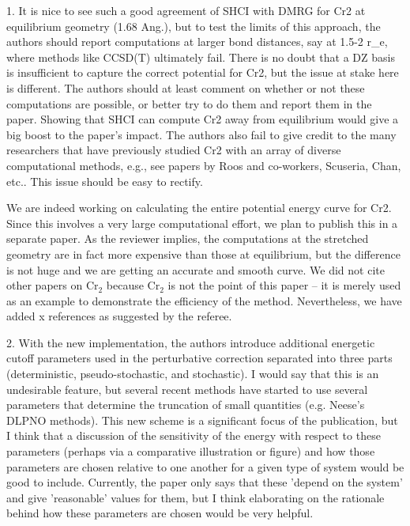 \documentclass[
reprint,
 superscriptaddress,
 amsmath,amssymb,
 aps,
]{revtex4-1}
\begin{document}
{\color{blue}
1. It is nice to see such a good agreement of SHCI with DMRG for Cr2 at equilibrium geometry (1.68 Ang.), but to test the limits of this approach, the authors should report computations at larger bond distances, say at 1.5-2 r\_e, where methods like CCSD(T) ultimately fail. There is no doubt that a DZ basis is insufficient to capture the correct potential for Cr2, but the issue at stake here is different. The authors should at least comment on whether or not these computations are possible, or better try to do them and report them in the paper. Showing that SHCI can compute Cr2 away from equilibrium would give a big boost to the paper's impact. The authors also fail to give credit to the many researchers that have previously studied Cr2 with an array of diverse computational methods, e.g., see papers by Roos and co-workers, Scuseria, Chan, etc.. This issue should be easy to rectify.
}\color{black}

We are indeed working on calculating the entire potential energy curve for Cr2.  Since this involves a very large computational effort,
we plan to publish this in a separate paper.  As the reviewer implies, the computations at the stretched geometry are in fact
more expensive than those at equilibrium, but the difference is not huge and we are getting an accurate and smooth curve.
We did not cite other papers on Cr$_2$ because Cr$_2$ is not the point of this paper -- it is merely used as an example to demonstrate
the efficiency of the method.  Nevertheless, we have added x references as suggested by the referee.

{\color{blue}
2. With the new implementation, the authors introduce additional energetic cutoff parameters used in the perturbative correction separated into three parts (deterministic, pseudo-stochastic, and stochastic). I would say that this is an undesirable feature, but several recent methods have started to use several parameters that determine the truncation of small quantities (e.g. Neese's DLPNO methods). This new scheme is a significant focus of the publication, but I think that a discussion of the sensitivity of the energy with respect to these parameters (perhaps via a comparative illustration or figure) and how those parameters are chosen relative to one another for a given type of system would be good to include. Currently, the paper only says that these 'depend on the system' and give 'reasonable' values for them, but I think elaborating on the rationale behind how these parameters are chosen would be very helpful.
}\color{black}
\end{document}

